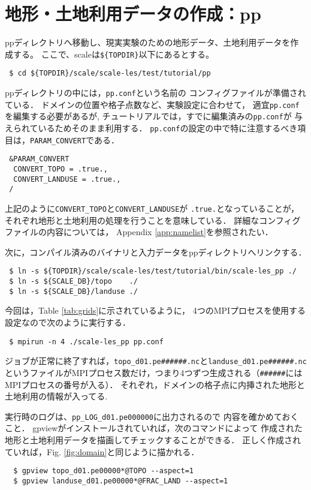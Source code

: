 
\section{地形・土地利用データの作成：pp}

ppディレクトリへ移動し、現実実験のための地形データ、土地利用データを作成する。
ここで、scaleは\verb|${TOPDIR}|以下にあるとする。
\begin{verbatim}
 $ cd ${TOPDIR}/scale/scale-les/test/tutorial/pp
\end{verbatim}
ppディレクトリの中には，\verb|pp.conf|という名前の
コンフィグファイルが準備されている．
ドメインの位置や格子点数など、実験設定に合わせて，
適宜\verb|pp.conf|を編集する必要があるが,
チュートリアルでは，すでに編集済みの\verb|pp.conf|が
与えられているためそのまま利用する．
\verb|pp.conf|の設定の中で特に注意するべき項目は，\verb|PARAM_CONVERT|である．
\begin{verbatim}
 &PARAM_CONVERT
  CONVERT_TOPO = .true.,
  CONVERT_LANDUSE = .true.,
 /
\end{verbatim}
上記のように\verb|CONVERT_TOPO|と\verb|CONVERT_LANDUSE|が
\verb|.true.|となっていることが，
それぞれ地形と土地利用の処理を行うことを意味している．
詳細なコンフィグファイルの内容については，
Appendix \ref{app:namelist}を参照されたい．

次に，コンパイル済みのバイナリと入力データをppディレクトリへリンクする．
\begin{verbatim}
 $ ln -s ${TOPDIR}/scale/scale-les/test/tutorial/bin/scale-les_pp ./
 $ ln -s ${SCALE_DB}/topo    ./
 $ ln -s ${SCALE_DB}/landuse ./
\end{verbatim}
今回は，Table \ref{tab:grids}に示されているように，
4つのMPIプロセスを使用する設定なので次のように実行する．
\begin{verbatim}
 $ mpirun -n 4 ./scale-les_pp pp.conf
\end{verbatim}
ジョブが正常に終了すれば，\verb|topo_d01.pe######.nc|と\verb|landuse_d01.pe######.nc|というファイルがMPIプロセス数だけ，つまり4つずつ生成される（\verb|######|にはMPIプロセスの番号が入る）．
それぞれ，ドメインの格子点に内挿された地形と土地利用の情報が入ってる.


実行時のログは、\verb|pp_LOG_d01.pe000000|に出力されるので
内容を確かめておくこと．
gpviewがインストールされていれば，次のコマンドによって
作成された地形と土地利用データを描画してチェックすることができる．
正しく作成されていれば，Fig. \ref{fig:domain}と同じように描かれる．
\begin{verbatim}
  $ gpview topo_d01.pe00000*@TOPO --aspect=1
  $ gpview landuse_d01.pe00000*@FRAC_LAND --aspect=1
\end{verbatim}

